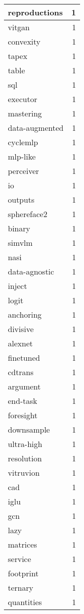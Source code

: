 \begin{table}[h]
\begin{tabular}{|l|r|}
\hline
reproductions & 1 \\
\hline
vitgan & 1 \\
\hline
convexity & 1 \\
\hline
tapex & 1 \\
\hline
table & 1 \\
\hline
sql & 1 \\
\hline
executor & 1 \\
\hline
mastering & 1 \\
\hline
data-augmented & 1 \\
\hline
cyclemlp & 1 \\
\hline
mlp-like & 1 \\
\hline
perceiver & 1 \\
\hline
io & 1 \\
\hline
outputs & 1 \\
\hline
sphereface2 & 1 \\
\hline
binary & 1 \\
\hline
simvlm & 1 \\
\hline
nasi & 1 \\
\hline
data-agnostic & 1 \\
\hline
inject & 1 \\
\hline
logit & 1 \\
\hline
anchoring & 1 \\
\hline
divisive & 1 \\
\hline
alexnet & 1 \\
\hline
finetuned & 1 \\
\hline
cdtrans & 1 \\
\hline
argument & 1 \\
\hline
end-task & 1 \\
\hline
foresight & 1 \\
\hline
downsample & 1 \\
\hline
ultra-high & 1 \\
\hline
resolution & 1 \\
\hline
vitruvion & 1 \\
\hline
cad & 1 \\
\hline
iglu & 1 \\
\hline
gcn & 1 \\
\hline
lazy & 1 \\
\hline
matrices & 1 \\
\hline
service & 1 \\
\hline
footprint & 1 \\
\hline
ternary & 1 \\
\hline
quantities & 1 \\

\end{tabular}
\end{table}

